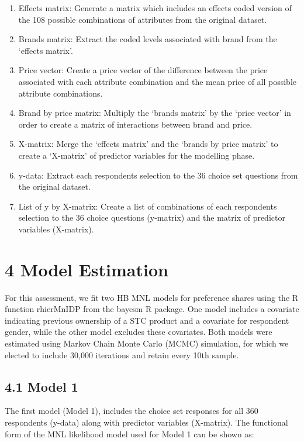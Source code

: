 \documentclass[]{article}
\providecommand{\tightlist}{%
  \setlength{\itemsep}{0pt}\setlength{\parskip}{0pt}}
\begin{document}
\begin{enumerate}
\def\labelenumi{\arabic{enumi})}
\tightlist
\item
  Effects matrix: Generate a matrix which includes an effects coded
  version of the 108 possible combinations of attributes from the
  original dataset.
\item
  Brands matrix: Extract the coded levels associated with brand from the
  `effects matrix'.
\item
  Price vector: Create a price vector of the difference between the
  price associated with each attribute combination and the mean price of
  all possible attribute combinations.
\item
  Brand by price matrix: Multiply the `brands matrix' by the `price
  vector' in order to create a matrix of interactions between brand and
  price.
\item
  X-matrix: Merge the `effects matrix' and the `brands by price matrix'
  to create a `X-matrix' of predictor variables for the modelling phase.
\item
  y-data: Extract each respondents selection to the 36 choice set
  questions from the original dataset.
\item
  List of y by X-matrix: Create a list of combinations of each
  respondents selection to the 36 choice questions (y-matrix) and the
  matrix of predictor variables (X-matrix).
\end{enumerate}

\section{4 Model Estimation}\label{model-estimation}

For this assessment, we fit two HB MNL models for preference shares
using the R function rhierMnIDP from the bayesm R package. One model
includes a covariate indicating previous ownership of a STC product and
a covariate for respondent gender, while the other model excludes these
covariates. Both models were estimated using Markov Chain Monte Carlo
(MCMC) simulation, for which we elected to include 30,000 iterations and
retain every 10th sample.

\subsection{4.1 Model 1}\label{model-1}

The first model (Model 1), includes the choice set responses for all 360
respondents (y-data) along with predictor variables (X-matrix). The
functional form of the MNL likelihood model used for Model 1 can be
shown as:
\end{document}
